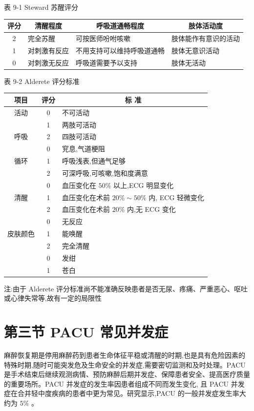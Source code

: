 \documentclass[10pt]{article}
\begin{document}
表 9-1 Steward 苏醒评分

\begin{center}
\begin{tabular}{clll}
\hline
评分 & \multicolumn{1}{c}{清醒程度} & \multicolumn{1}{c}{呼吸道通畅程度} & \multicolumn{1}{c}{肢体活动度} \\
\hline
2 & 完全苏醒 & 可按医师吩咐咳嗽 & 肢体能作有意识的活动 \\
1 & 对刺激有反应 & 不用支持可以维持呼吸道通畅 & 肢体无意识活动 \\
0 & 对刺激无反应 & 呼吸道需要予以支持 & 肢体无活动 \\
\hline
\end{tabular}
\end{center}

表 9-2 Alderete 评分标准

\begin{center}
\begin{tabular}{ccl}
\hline
项目 & 评分 & \multicolumn{1}{c}{标 准} \\
\hline
活动 & 0 & 不可活动 \\
 & 1 & 两肢可活动 \\
呼吸 & 2 & 四肢可活动 \\
 & 0 & 䆓息,气道梗阻 \\
循环 & 1 & 呼吸浅表,但通气足够 \\
 & 2 & 可深呼吸,可咳嗽,饱和度满意 \\
 & 0 & 血压变化在 $50 \%$ 以上,ECG 明显变化 \\
清醒 & 1 & 血压变化在术前 $20 \% \sim 50 \%$ 内, ECG 轻微变化 \\
 & 2 & 血压变化在术前 $20 \%$ 内,无 ECG 变化 \\
 & 0 & 无反应 \\
皮肤颜色 & 1 & 能唤醒 \\
 & 2 & 完全清醒 \\
 & 0 & 发绀 \\
 & 1 & 苍白 \\
\hline
\end{tabular}
\end{center}

注:由于 Alderete 评分标准尚不能准确反映患者是否无尿、疼痛、严重恶心、呕吐或心律失常等,故有一定的局限性

\section*{第三节 PACU 常见并发症}
麻醉恢复期是停用麻醉药到患者生命体征平稳或清醒的时期,也是具有危险因素的特殊时期,随时可能突发危及生命安全的并发症,需要密切监测和及时处理。PACU 是手术结束后继续观测病情、预防麻醉后期并发症、保障患者安全、提高医疗质量的重要场所。PACU 并发症的发生率因患者组成不同而发生变化, 且 PACU 并发症在合并轻中度疾病的患者中更为常见。研究显示,PACU 的一般并发症发生率大约为 $5 \%$ 。
\end{document}
